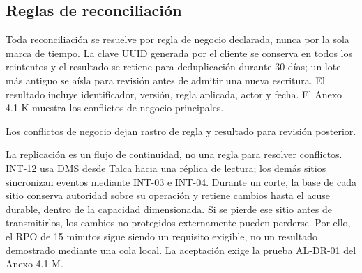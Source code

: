 \subsection{Reglas de reconciliación}
\label{sec:reglas-reconciliacion}

Toda reconciliación se resuelve por regla de negocio declarada, nunca por la sola marca de tiempo. La clave UUID generada por el cliente se conserva en todos los reintentos y el resultado se retiene para deduplicación durante 30 días; un lote más antiguo se aísla para revisión antes de admitir una nueva escritura. El resultado incluye identificador, versión, regla aplicada, actor y fecha. El Anexo 4.1-K muestra los conflictos de negocio principales.


Los conflictos de negocio dejan rastro de regla y resultado para revisión posterior.

La replicación es un flujo de continuidad, no una regla para resolver conflictos. INT-12 usa DMS desde Talca hacia una réplica de lectura; los demás sitios sincronizan eventos mediante INT-03 e INT-04. Durante un corte, la base de cada sitio conserva autoridad sobre su operación y retiene cambios hasta el acuse durable, dentro de la capacidad dimensionada. Si se pierde ese sitio antes de transmitirlos, los cambios no protegidos externamente pueden perderse. Por ello, el RPO de 15 minutos sigue siendo un requisito exigible, no un resultado demostrado mediante una cola local. La aceptación exige la prueba AL-DR-01 del Anexo 4.1-M.

